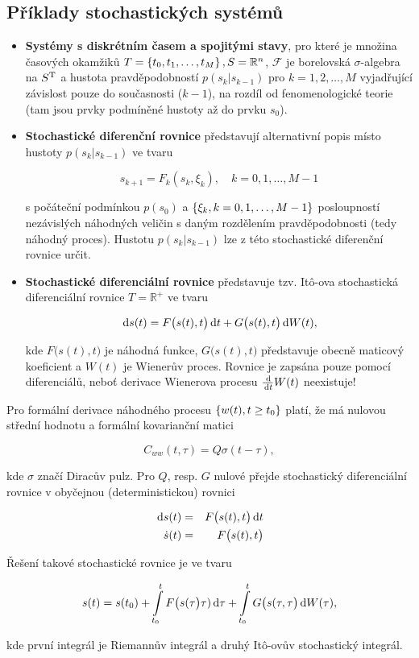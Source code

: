 \subsection{Příklady stochastických systémů}
\begin{itemize}
\item \textbf{Systémy s diskrétním časem a spojitými stavy}, pro které je množina časových okamžiků $T = \left\{t_0,t_1,\ldots, t_M\right\}, S=\mathbb{R}^n$, $\mathscr{F}$ je borelovská $\sigma$-algebra na $S^{\mathrm{T}}$ a hustota pravděpodobností $p(s_k|s_{k-1})$ pro $k=1,2,\ldots,M$ vyjadřující závislost pouze do současnosti ($k-1$), na rozdíl od fenomenologické teorie (tam jsou prvky podmíněné hustoty až do prvku $s_0$).

\item \textbf{Stochastické diferenční rovnice} představují alternativní popis místo hustoty $p(s_k|s_{k-1})$ ve tvaru

\[ s_{k+1}=F_k(s_k,\xi_k),\quad k=0,1,\ldots, M-1 \]

s počáteční podmínkou $p(s_0)$ a $\left\{\xi_k, k=0,1,\ldots,M-1\right\}$ posloupností nezávislých náhodných veličin s daným rozdělením pravděpodobnosti (tedy náhodný proces). Hustotu $p(s_k|s_{k-1})$ lze z této stochastické diferenční rovnice určit.

\item \textbf{Stochastické diferenciální rovnice} představuje tzv. Itô-ova stochastická diferenciální rovnice $T=\mathbb{R}^+$ ve tvaru

\[ \,\mathrm{d} s(t) = F\big(s(t),t\big)\,\mathrm{d} t + G\big(s(t),t\big)\,\mathrm{d} W(t), \]

kde $F\big(s(t),t\big)$ je náhodná funkce, $G\big(s(t),t\big)$ představuje obecně maticový koeficient a $W(t)$ je Wienerův proces. Rovnice je zapsána pouze pomocí diferenciálů, neboť derivace Wienerova procesu $\frac{\,\mathrm{d}}{\,\mathrm{d} t} W(t)$ neexistuje!
\end{itemize}

Pro formální derivace náhodného procesu $\left\{w(t), t\geq t_0\right\}$ platí, že má nulovou střední hodnotu a formální kovarianční matici

\[ C_{ww}(t,\tau)=Q\sigma(t-\tau), \]

kde $\sigma$ značí Diracův pulz. Pro $Q$, resp. $G$ nulové přejde stochastický diferenciální rovnice v obyčejnou (deterministickou) rovnici

\begin{eqnarray*}
\,\mathrm{d} s(t) & = & F\big(s(t),t\big)\,\mathrm{d} t\\
\dot{s}(t) & = & F\big(s(t),t\big)
\end{eqnarray*}

Řešení takové stochastické rovnice je ve tvaru

\[ s(t) = s(t_0) + \int\limits_{t_0}^t F\big(s(\tau\big)\tau)\,\mathrm{d}\tau + \int\limits_{t_0}^t G\big(s(\tau,\tau\big)\,\mathrm{d} W(\tau), \]

kde první integrál je Riemannův integrál a druhý Itô-ovův stochastický integrál.